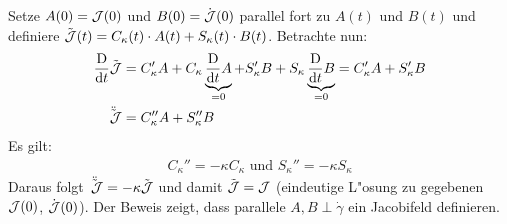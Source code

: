 \begin{Loes}
Setze $A(0) = \operatorname{\mathcal{J}}(0)$ und $B(0) = \dot{\operatorname{\mathcal{J}}}(0)$ parallel fort zu $A(t)$ und $B(t)$ und definiere $\tilde{\operatorname{\mathcal{J}}}(t) = C_\kappa(t) \cdot A(t) + S_\kappa(t) \cdot B(t)$.
Betrachte nun:
\begin{align*}
	\frac{\operatorname{D}}{\mathrm{d} t} \tilde{\operatorname{\mathcal{J}}} &= C_\kappa' A + C_\kappa \underbrace{\frac{\operatorname{D}}{\mathrm{d} t} A}_{=0} + S_\kappa' B + S_\kappa \underbrace{\frac{\operatorname{D}}{\mathrm{d} t} B}_{=0} = C_\kappa' A + S_\kappa' B \\
	\ddot{\tilde{\operatorname{\mathcal{J}}}} &= C_\kappa'' A + S_\kappa'' B
\end{align*}
Es gilt:
\begin{align*}
	C_\kappa'' = -\kappa C_\kappa \text{ und } S_\kappa'' = -\kappa S_\kappa
\end{align*}
Daraus folgt $\ddot{\tilde{\operatorname{\mathcal{J}}}} = -\kappa \tilde{\operatorname{\mathcal{J}}}$ und damit $\tilde{\operatorname{\mathcal{J}}} = \operatorname{\mathcal{J}}$ (eindeutige L"osung zu gegebenen $\operatorname{\mathcal{J}}(0)$, $\dot{\operatorname{\mathcal{J}}}(0)$).
Der Beweis zeigt, dass parallele $A, B \perp \dot\gamma$ ein Jacobifeld definieren.
\end{Loes}

